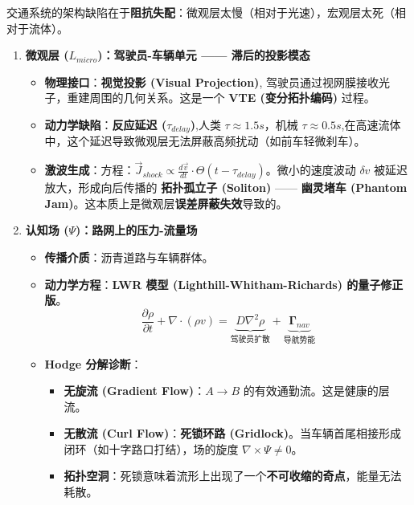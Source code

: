 

交通系统的架构缺陷在于\textbf{阻抗失配}：微观层太慢（相对于光速），宏观层太死（相对于流体）。
\begin{enumerate}
    \item \textbf{微观层 ($L_{micro}$)：驾驶员-车辆单元 —— 滞后的投影模态}
    \begin{itemize}
        \item   \textbf{物理接口}：\textbf{视觉投影 (Visual Projection)}, 驾驶员通过视网膜接收光子，重建周围的几何关系。这是一个 \textbf{VTE (变分拓扑编码)} 过程。
        \item   \textbf{动力学缺陷}：\textbf{反应延迟 ($\tau_{delay}$)},人类 $\tau \approx 1.5s$，机械 $\tau \approx 0.5s$,在高速流体中，这个延迟导致微观层无法屏蔽高频扰动（如前车轻微刹车）。
        \item   \textbf{激波生成}：方程：$\vec{J}_{shock} \propto \frac{d\vec{v}}{dt} \cdot \Theta(t - \tau_{delay})$。微小的速度波动 $\delta v$ 被延迟放大，形成向后传播的 \textbf{拓扑孤立子 (Soliton)} —— \textbf{幽灵堵车 (Phantom Jam)}。这本质上是微观层\textbf{误差屏蔽失效}导致的。
    \end{itemize}

    \item \textbf{认知场 ($\Psi$)：路网上的压力-流量场}
    \begin{itemize}
        \item   \textbf{传播介质}：沥青道路与车辆群体。
        \item   \textbf{动力学方程}：\textbf{LWR 模型 (Lighthill-Whitham-Richards) 的量子修正版}。
            $$ \frac{\partial \rho}{\partial t} + \nabla \cdot (\rho v) = \underbrace{D \nabla^2 \rho}_{\text{驾驶员扩散}} + \underbrace{\mathbf{\Gamma}_{nav}}_{\text{导航势能}} $$
        \item   \textbf{Hodge 分解诊断}：
        \begin{itemize}
            \item   \textbf{无旋流 (Gradient Flow)}：$A \to B$ 的有效通勤流。这是健康的层流。
            \item   \textbf{无散流 (Curl Flow)}：\textbf{死锁环路 (Gridlock)}。当车辆首尾相接形成闭环（如十字路口打结），场的旋度 $\nabla \times \Psi \neq 0$。
            \item   \textbf{拓扑空洞}：死锁意味着流形上出现了一个\textbf{不可收缩的奇点}，能量无法耗散。
        \end{itemize}
    \end{itemize}


\end{enumerate}

